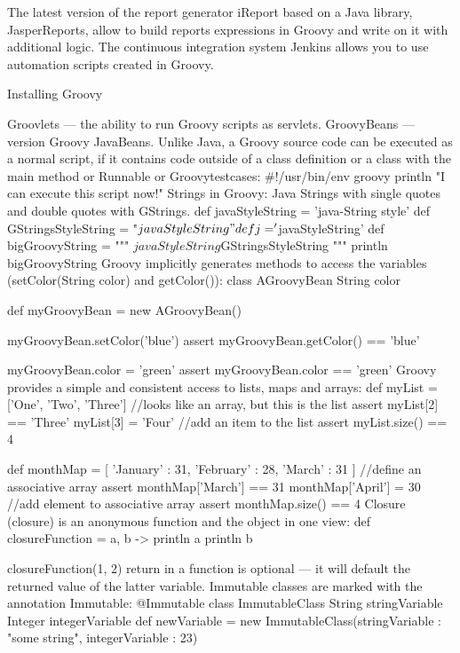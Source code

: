 \documentclass[12pt]{article}
\begin{document}
The latest version of the report generator iReport based on a Java library, JasperReports, allow to build reports expressions in Groovy and write on it with additional logic.
The continuous integration system Jenkins allows you to use automation scripts created in Groovy.{}

Installing Groovy{}

Groovlets — the ability to run Groovy scripts as servlets.
GroovyBeans — version Groovy JavaBeans.
Unlike Java, a Groovy source code can be executed as a normal script, if it contains code outside of a class definition or a class with the main method or Runnable or Groovytestcases:
#!/usr/bin/env groovy{}
println "I can execute this script now!"
Strings in Groovy: Java Strings with single quotes and double quotes with GStrings.
def javaStyleString = 'java-String style'
def GStringsStyleString = "${javaStyleString}"{}
def j = '${javaStyleString}' {}
def bigGroovyString = """
${javaStyleString}{}
${GStringsStyleString}{}
"""
println bigGroovyString
Groovy implicitly generates methods to access the variables (setColor(String color) and getColor()):
class AGroovyBean {{}
String color
}{}

def myGroovyBean = new AGroovyBean()

myGroovyBean.setColor('blue')
assert myGroovyBean.getColor() == 'blue'

myGroovyBean.color = 'green'
assert myGroovyBean.color == 'green'
Groovy provides a simple and consistent access to lists, maps and arrays:
def myList = ['One', 'Two', 'Three'] //looks like an array, but this is the list
assert myList[2] == 'Three'
myList[3] = 'Four' //add an item to the list
assert myList.size() == 4

def monthMap = [ 'January' : 31, 'February' : 28, 'March' : 31 ] //define an associative array
assert monthMap['March'] == 31 
monthMap['April'] = 30 //add element to associative array
assert monthMap.size() == 4
Closure (closure) is an anonymous function and the object in one view:
def closureFunction = {a, b ->{}
println a
println b
}

closureFunction(1, 2)
return in a function is optional — it will default the returned value of the latter variable.
Immutable classes are marked with the annotation Immutable:
@Immutable
class ImmutableClass {{}
 String stringVariable
Integer integerVariable
}{}
def newVariable = new ImmutableClass(stringVariable : "some string", integerVariable : 23)
\end{document}
